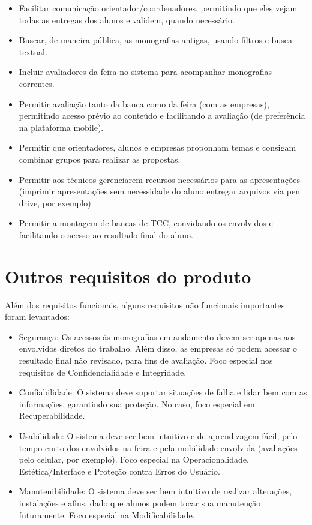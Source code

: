 \begin{itemize}
    \item Facilitar comunicação orientador/coordenadores, permitindo que eles vejam todas as entregas dos alunos e validem, quando necessário.
    \item Buscar, de maneira pública, as monografias antigas, usando filtros e busca textual.
    \item Incluir avaliadores da feira no sistema para acompanhar monografias correntes.
    \item Permitir avaliação tanto da banca como da feira (com as empresas), permitindo acesso prévio ao conteúdo e facilitando a avaliação (de preferência na plataforma mobile).
    \item Permitir que orientadores, alunos e empresas proponham temas e consigam combinar grupos para realizar as propostas.
    \item Permitir aos técnicos gerenciarem recursos necessários para as apresentações (imprimir apresentações sem necessidade do aluno entregar arquivos via pen drive, por exemplo)
    \item Permitir a montagem de bancas de TCC, convidando os envolvidos e facilitando o acesso ao resultado final do aluno.
\end{itemize}
  
\section{Outros requisitos do produto}
Além dos requisitos funcionais, alguns requisitos não funcionais importantes foram levantados:

\begin{itemize}
    \item Segurança: Os acessos às monografias em andamento devem ser apenas aos envolvidos diretos do trabalho. Além disso, as empresas só podem acessar o resultado final não revisado, para fins de avaliação. Foco especial nos requisitos de Confidencialidade e Integridade.
    \item Confiabilidade: O sistema deve suportar situações de falha e lidar bem com as informações, garantindo sua proteção. No caso, foco especial em Recuperabilidade.
    \item Usabilidade: O sistema deve ser bem intuitivo e de aprendizagem fácil, pelo tempo curto dos envolvidos na feira e pela mobilidade envolvida (avaliações pelo celular, por exemplo). Foco especial na Operacionalidade, Estética/Interface e Proteção contra Erros do Usuário.
    \item Manutenibilidade: O sistema deve ser bem intuitivo de realizar alterações, instalações e afins, dado que alunos podem tocar sua manutenção futuramente. Foco especial na Modificabilidade.
\end{itemize}
